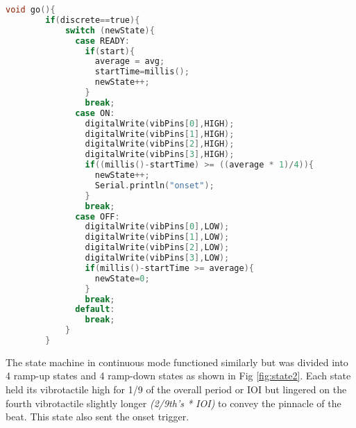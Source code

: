 \begin{lstlisting}[language=C]
    void go(){
        if(discrete==true){
            switch (newState){
              case READY:
                if(start){
                  average = avg;
                  startTime=millis();
                  newState++;
                }
                break;
              case ON: 
                digitalWrite(vibPins[0],HIGH);
                digitalWrite(vibPins[1],HIGH);
                digitalWrite(vibPins[2],HIGH);
                digitalWrite(vibPins[3],HIGH);
                if((millis()-startTime) >= ((average * 1)/4)){
                  newState++;
                  Serial.println("onset");
                }
                break;
              case OFF:
                digitalWrite(vibPins[0],LOW);
                digitalWrite(vibPins[1],LOW);
                digitalWrite(vibPins[2],LOW);
                digitalWrite(vibPins[3],LOW);
                if(millis()-startTime >= average){
                  newState=0;
                }
                break;
              default:
                break;
            }
        }
\end{lstlisting}

The state machine in continuous mode functioned similarly but was divided into 4 ramp-up states and 4 ramp-down states as shown in Fig \ref{fig:state2}. Each state held its vibrotactile high for 1/9 of the overall period or IOI but lingered on the fourth vibrotactile slightly longer \textit{(2/9th's * IOI)} to convey the pinnacle of the beat. This state also sent the onset trigger.

